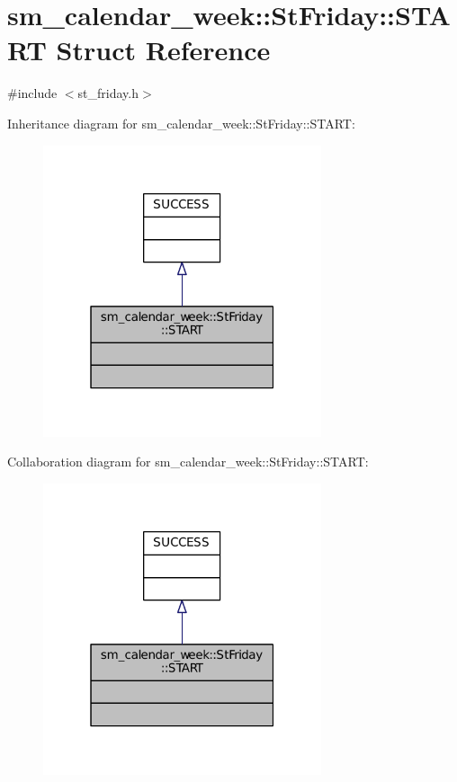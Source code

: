 \hypertarget{structsm__calendar__week_1_1StFriday_1_1START}{}\section{sm\+\_\+calendar\+\_\+week\+:\+:St\+Friday\+:\+:S\+T\+A\+RT Struct Reference}
\label{structsm__calendar__week_1_1StFriday_1_1START}


{\ttfamily \#include $<$st\+\_\+friday.\+h$>$}



Inheritance diagram for sm\+\_\+calendar\+\_\+week\+:\+:St\+Friday\+:\+:S\+T\+A\+RT\+:
\nopagebreak
\begin{figure}[H]
\begin{center}
\leavevmode
\includegraphics[width=232pt]{structsm__calendar__week_1_1StFriday_1_1START__inherit__graph}
\end{center}
\end{figure}


Collaboration diagram for sm\+\_\+calendar\+\_\+week\+:\+:St\+Friday\+:\+:S\+T\+A\+RT\+:
\nopagebreak
\begin{figure}[H]
\begin{center}
\leavevmode
\includegraphics[width=232pt]{structsm__calendar__week_1_1StFriday_1_1START__coll__graph}
\end{center}
\end{figure}


